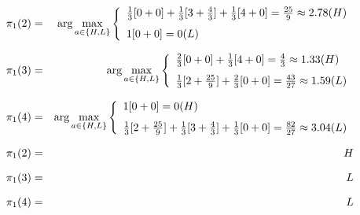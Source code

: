 \documentclass[12pt]{article}
\begin{document}
\begin{enumerate}
\begin{enumerate}
  \begin{eqnarray*}
    \pi_1(2) &=& \hbox{arg} \max_{a \in \{H, L\}} \left\{
                \begin{array}{l}
                  \frac{1}{3}[0 + 0] + \frac{1}{3}[3 + \frac{4}{3}] + \frac{1}{3}[4 + 0] = \frac{25}{9} \approx 2.78 (H)
                  \\[.1in]
                  1[0 + 0] = 0 (L)
                \end{array} \right. \\[.1in]
    \pi_1(3) &=& \hbox{arg} \max_{a \in \{H, L\}} \left\{
                \begin{array}{l}
                  \frac{2}{3}[0 + 0] + \frac{1}{3}[4 + 0] = \frac{4}{3} \approx 1.33 (H)
                  \\[.1in]
                  \frac{1}{3}[2 + \frac{25}{9}] + \frac{2}{3}[0 + 0] = \frac{43}{27} \approx 1.59 (L)
                \end{array} \right. \\[.1in]
    \pi_1(4) &=& \hbox{arg} \max_{a \in \{H, L\}} \left\{
                \begin{array}{l}
                  1[0 + 0] = 0 (H)
                  \\[.1in]
                  \frac{1}{3}[2 + \frac{25}{9}] + \frac{1}{3}[3 + \frac{4}{3}] + \frac{1}{3}[0 + 0] = \frac{82}{27} \approx 3.04 (L)
                \end{array} \right. \\[.1in]
    \pi_1(2) &=& H \\[.1in]
    \pi_1(3) &=& L \\[.1in]
    \pi_1(4) &=& L
  \end{eqnarray*}

  \end{enumerate}

\end{enumerate}
\end{document}

